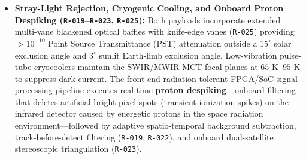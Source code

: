 \documentclass[11pt,a4paper]{article}
\providecommand{\abbr}[1]{#1}
\begin{document}
\begin{itemize}
\begin{enumerate}
        \item \emph{Fine Stage --- Piezo-Actuated Fast Steering Mirror (\abbr{FSM}):} A closed-loop two-axis fine steering mirror at an internal optical pupil image operates with a control bandwidth of $\ge 200\text{ Hz}$ and sub-microradian resolution. Once the coarse gimbal settles, the \abbr{FSM} locks onto the plume centroid within $\le 1.0\text{--}1.5\text{ s}$ (total acquisition $< 5.0\text{ s}$) and actively suppresses micro-vibrations generated by reaction wheels, cryocoolers, and dynamic slewing of the \abbr{SWIR}/\abbr{MWIR} sensor gimbals, directional \abbr{RF} antennas, and agile \abbr{OISL} terminals to hold \abbr{LOS} jitter below $< 2\text{ arcsec/s}$ ($\le 9.7~\mu\mathrm{rad/s}$ RMS). Paired with an optical-bench dual star tracker and fibre-optic gyroscope (\abbr{FOG}) inertial reference unit, each \texttt{SATL} achieves an Attitude/\abbr{LOS} Knowledge Error (\abbr{AKE}) of $\le 10\text{--}15~\mu\mathrm{rad}$ ($\le 2\text{--}3\text{ arcsec}$, $1\sigma$), corresponding to a cross-range target position error of $< 15\text{--}30\text{ m}$ at 1,000--2,000~km slant range.
    \end{enumerate}
    \item \textbf{Stray-Light Rejection, Cryogenic Cooling, and Onboard Proton Despiking (\texttt{R-019}--\texttt{R-023}, \texttt{R-025}):} Both payloads incorporate extended multi-vane blackened optical baffles with knife-edge vanes (\texttt{R-025}) providing $> 10^{-10}$ Point Source Transmittance (PST) attenuation outside a $15^\circ$ solar exclusion angle and $3^\circ$ sunlit Earth-limb exclusion angle. Low-vibration pulse-tube cryocoolers maintain the \abbr{SWIR}/\abbr{MWIR} \abbr{MCT} focal planes at $65\text{ K}\text{--}95\text{ K}$ to suppress dark current. The front-end radiation-tolerant FPGA/SoC signal processing pipeline executes real-time \textbf{proton despiking}---onboard filtering that deletes artificial bright pixel spots (transient ionization spikes) on the infrared detector caused by energetic protons in the space radiation environment---followed by adaptive spatio-temporal background subtraction, track-before-detect filtering (\texttt{R-019}, \texttt{R-022}), and onboard dual-satellite stereoscopic triangulation (\texttt{R-023}).
\end{itemize}

\end{document}
